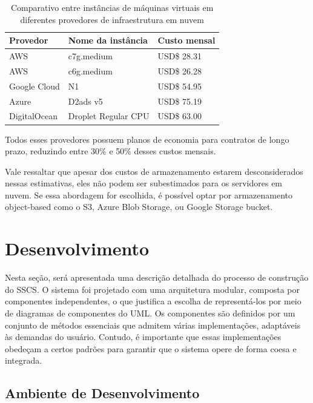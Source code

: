 \documentclass[12pt, %
openright, 
oneside, %
a4paper,    %
brazil]{facom-ufu-abntex2}
\begin{document}
\begin{table}[ht]
	\centering
	\caption{Comparativo entre instâncias de máquinas virtuais em
		diferentes provedores de infraestrutura em nuvem}
	\label{tab:estima}
	\begin{tabular}{|l|l|l|}
		\hline
		Provedor     & Nome da instância   & Custo mensal
		\\ \hline
		AWS          & c7g.medium          & USD\$ 28.31
		\\ \hline
		AWS          & c6g.medium          & USD\$ 26.28
		\\ \hline
		Google Cloud & N1                  & USD\$ 54.95
		\\ \hline
		Azure        & D2ads v5            & USD\$ 75.19
		\\ \hline
		DigitalOcean & Droplet Regular CPU & USD\$ 63.00
		\\ \hline
	\end{tabular}
\end{table}

Todos esses provedores possuem planos de economia para contratos de longo
prazo, reduzindo entre 30\% e 50\% desses custos mensais.

Vale ressaltar que apesar dos custos de armazenamento estarem desconsiderados
nessas estimativas, eles não podem ser subestimados para os servidores em
nuvem. Se essa abordagem for escolhida, é possível optar por armazenamento
object-based como o S3, Azure Blob Storage, ou Google Storage bucket.

\chapter{Desenvolvimento}

Nesta seção, será apresentada uma descrição detalhada do processo de construção
do SSCS. O sistema foi projetado com uma arquitetura modular, composta por
componentes independentes, o que justifica a escolha de representá-los por meio
de diagramas de componentes do UML. Os componentes são definidos por um
conjunto de métodos essenciais que admitem várias implementações, adaptáveis às
demandas do usuário. Contudo, é importante que essas implementações obedeçam a
certos padrões para garantir que o sistema opere de forma coesa e integrada.

\section{Ambiente de Desenvolvimento}
\label{sec:amb}
\end{document}
